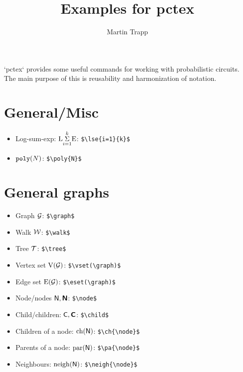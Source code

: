 \documentclass[11pt]{article}
\title{Examples for pctex}
\author{ Martin Trapp }
\date{}
\begin{document}
\maketitle

\noindent
`pctex` provides some useful commands for working with probabilistic circuits. The main purpose of this is reusability and harmonization of notation.

\section{General/Misc}
\begin{itemize}
	\item Log-sum-exp: $\lse{i=1}{k}$: \verb!$\lse{i=1}{k}$!
	\item $\poly{N}$: \verb!$\poly{N}$!
\end{itemize}

\section{General graphs}
\begin{itemize}
	\item Graph $\graph$: \verb!$\graph$!
	\item Walk $\walk$: \verb!$\walk$!
	\item Tree $\tree$: \verb!$\tree$!
	\item Vertex set $\vset(\graph)$: \verb!$\vset(\graph)$!
	\item Edge set $\eset(\graph)$: \verb!$\eset(\graph)$!
	\item Node/nodes $\node, \nodes$: \verb!$\node$!
	\item Child/children: $\cnode, \cnodes$: \verb!$\child$!
	\item Children of a node: $\ch{\node}$: \verb!$\ch{\node}$!
	\item Parents of a node: $\pa{\node}$: \verb!$\pa{\node}$!
	\item Neighbours: $\neigh{\node}$: \verb!$\neigh{\node}$!
\end{itemize}
\end{document}

